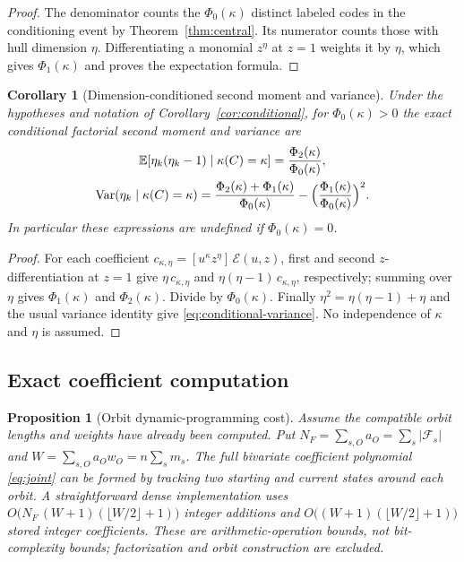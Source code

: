\documentclass[10pt,a4paper]{article}
\newcommand{\Fs}{\mathcal F_s}
\newcommand{\Epoly}{\mathscr E}
\numberwithin{equation}{section}
\theoremstyle{plain}
\newtheorem{proposition}[theorem]{Proposition}
\newtheorem{corollary}[theorem]{Corollary}
\theoremstyle{definition}
\theoremstyle{remark}
\begin{document}
\begin{proof}
The denominator counts the $\Phi_0(\kappa)$ distinct labeled codes in the
conditioning event by Theorem~\ref{thm:central}. Its numerator counts those with
hull dimension $\eta$. Differentiating a monomial $z^{\eta}$ at $z=1$ weights it
by $\eta$, which gives $\Phi_1(\kappa)$ and proves the expectation formula.
\end{proof}

\begin{corollary}[Dimension-conditioned second moment and variance]\label{cor:conditional-variance}
Under the hypotheses and notation of Corollary~\ref{cor:conditional}, for
$\Phi_0(\kappa)>0$ the exact conditional factorial second moment and variance are
\begin{equation}\label{eq:conditional-variance}
\begin{gathered}
\mathbb E[\eta_k(\eta_k-1)\mid\kappa(C)=\kappa]=\frac{\Phi_2(\kappa)}{\Phi_0(\kappa)},
\\
\operatorname{Var}(\eta_k\mid\kappa(C)=\kappa)
 =\frac{\Phi_2(\kappa)+\Phi_1(\kappa)}{\Phi_0(\kappa)}
 -\Bigl(\frac{\Phi_1(\kappa)}{\Phi_0(\kappa)}\Bigr)^{2}.
\end{gathered}
\end{equation}
In particular these expressions are undefined if $\Phi_0(\kappa)=0$.
\end{corollary}

\begin{proof}
For each coefficient $c_{\kappa,\eta}=[u^{\kappa}z^{\eta}]\,\Epoly(u,z)$, first
and second $z$-differen\-tiation at $z=1$ give $\eta\,c_{\kappa,\eta}$ and
$\eta(\eta-1)\,c_{\kappa,\eta}$, respectively; summing over $\eta$ gives
$\Phi_1(\kappa)$ and $\Phi_2(\kappa)$. Divide by $\Phi_0(\kappa)$. Finally
$\eta^{2}=\eta(\eta-1)+\eta$ and the usual variance identity give
\eqref{eq:conditional-variance}. No independence of $\kappa$ and $\eta$ is
assumed.
\end{proof}

\subsection{Exact coefficient computation}\label{sec:algorithm}

\begin{proposition}[Orbit dynamic-programming cost]\label{prop:algorithm}
Assume the compatible orbit lengths and weights have already been computed. Put
$N_F=\sum_{s,O}a_O=\sum_s|\Fs|$ and $W=\sum_{s,O}a_Ow_O=n\sum_s m_s$. The full
bivariate coefficient polynomial \eqref{eq:joint} can be formed by tracking two
starting and current states around each orbit. A straightforward dense
implementation uses $O\bigl(N_F\,(W+1)(\lfloor W/2\rfloor+1)\bigr)$ integer
additions and $O\bigl((W+1)(\lfloor W/2\rfloor+1)\bigr)$ stored integer
coefficients. These are arithmetic-operation bounds, not bit-complexity bounds;
factorization and orbit construction are excluded.
\end{proposition}
\end{document}
